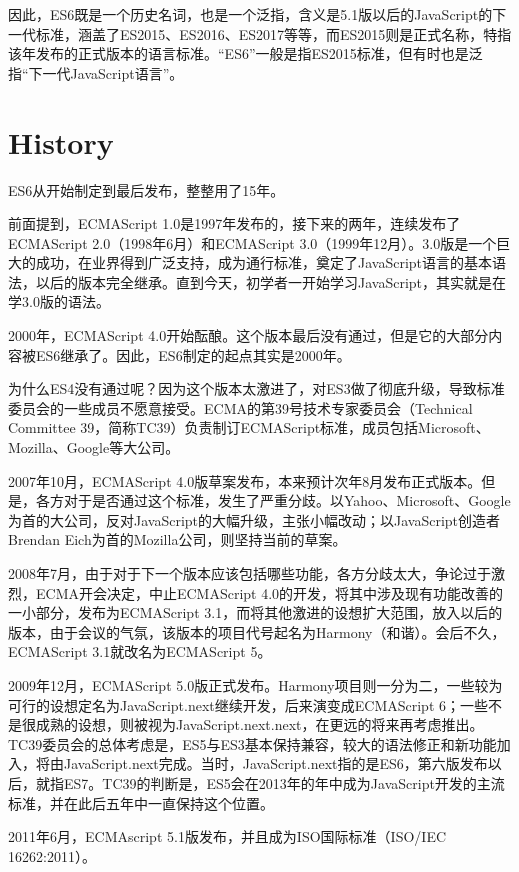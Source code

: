 因此，ES6既是一个历史名词，也是一个泛指，含义是5.1版以后的JavaScript的下一代标准，涵盖了ES2015、ES2016、ES2017等等，而ES2015则是正式名称，特指该年发布的正式版本的语言标准。“ES6”一般是指ES2015标准，但有时也是泛指“下一代JavaScript语言”。



\section{History}

ES6从开始制定到最后发布，整整用了15年。

前面提到，ECMAScript 1.0是1997年发布的，接下来的两年，连续发布了ECMAScript 2.0（1998年6月）和ECMAScript 3.0（1999年12月）。3.0版是一个巨大的成功，在业界得到广泛支持，成为通行标准，奠定了JavaScript语言的基本语法，以后的版本完全继承。直到今天，初学者一开始学习JavaScript，其实就是在学3.0版的语法。

2000年，ECMAScript 4.0开始酝酿。这个版本最后没有通过，但是它的大部分内容被ES6继承了。因此，ES6制定的起点其实是2000年。

为什么ES4没有通过呢？因为这个版本太激进了，对ES3做了彻底升级，导致标准委员会的一些成员不愿意接受。ECMA的第39号技术专家委员会（Technical Committee 39，简称TC39）负责制订ECMAScript标准，成员包括Microsoft、Mozilla、Google等大公司。

2007年10月，ECMAScript 4.0版草案发布，本来预计次年8月发布正式版本。但是，各方对于是否通过这个标准，发生了严重分歧。以Yahoo、Microsoft、Google为首的大公司，反对JavaScript的大幅升级，主张小幅改动；以JavaScript创造者Brendan Eich为首的Mozilla公司，则坚持当前的草案。

2008年7月，由于对于下一个版本应该包括哪些功能，各方分歧太大，争论过于激烈，ECMA开会决定，中止ECMAScript 4.0的开发，将其中涉及现有功能改善的一小部分，发布为ECMAScript 3.1，而将其他激进的设想扩大范围，放入以后的版本，由于会议的气氛，该版本的项目代号起名为Harmony（和谐）。会后不久，ECMAScript 3.1就改名为ECMAScript 5。

2009年12月，ECMAScript 5.0版正式发布。Harmony项目则一分为二，一些较为可行的设想定名为JavaScript.next继续开发，后来演变成ECMAScript 6；一些不是很成熟的设想，则被视为JavaScript.next.next，在更远的将来再考虑推出。TC39委员会的总体考虑是，ES5与ES3基本保持兼容，较大的语法修正和新功能加入，将由JavaScript.next完成。当时，JavaScript.next指的是ES6，第六版发布以后，就指ES7。TC39的判断是，ES5会在2013年的年中成为JavaScript开发的主流标准，并在此后五年中一直保持这个位置。

2011年6月，ECMAscript 5.1版发布，并且成为ISO国际标准（ISO/IEC 16262:2011）。

